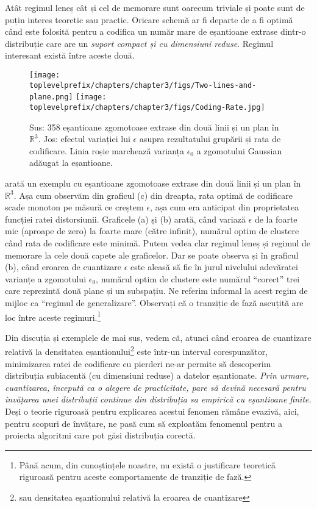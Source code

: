 \documentclass[../../book-main_ro.tex]{subfiles}
\begin{document}
Atât regimul leneș cât și cel de memorare sunt oarecum triviale și poate sunt de puțin interes teoretic sau practic. Oricare schemă ar fi departe de a fi optimă când este folosită pentru a codifica un număr mare de eșantioane extrase dintr-o distribuție care are un {\em suport compact și cu dimensiuni reduse}. Regimul interesant există între aceste două.
\begin{example}
	\begin{figure}[t]
		\centering
		\texttt{[image: \\toplevelprefix/chapters/chapter3/figs/Two-lines-and-plane.png]}
		\texttt{[image: \\toplevelprefix/chapters/chapter3/figs/Coding-Rate.jpg]}
		\caption{Sus: 358 eșantioane zgomotoase extrase din două linii și un plan în $\mathbb{R}^3$. Jos: efectul variației lui $\epsilon$ asupra rezultatului grupării și rata de codificare. Linia roșie marchează varianța $\epsilon_0$ a zgomotului Gaussian adăugat la eșantioane.}
		\label{fig:two-lines-and-plane}
		\label{fig:two-lines-and-plane-epsilon}
	\end{figure}
	 arată un exemplu cu eșantioane zgomotoase extrase din două linii și un plan în $\mathbb{R}^3$. Așa cum observăm din graficul (c) din dreapta, rata optimă de codificare scade monoton pe măsură ce creștem $\epsilon$, așa cum era anticipat din proprietatea funcției ratei distorsiunii. Graficele (a) și (b) arată, când variază $\epsilon$ de la foarte mic (aproape de zero) la foarte mare (către infinit), numărul optim de clustere când rata de codificare este minimă. Putem vedea clar regimul leneș și regimul de memorare la cele două capete ale graficelor. Dar se poate observa și în graficul (b), când eroarea de cuantizare $\epsilon$ este aleasă să fie în jurul nivelului adevăratei varianțe a zgomotului $\epsilon_0$, numărul optim de clustere este numărul ``corect'' trei care reprezintă două plane și un subspațiu. Ne referim informal la acest regim de mijloc ca ``regimul de generalizare''. Observați că o tranziție de fază ascuțită are loc între aceste regimuri.\footnote{Până acum, din cunoștințele noastre, nu există o justificare teoretică riguroasă pentru aceste comportamente de tranziție de fază.}
\end{example}

Din discuția și exemplele de mai sus, vedem că, atunci când eroarea de cuantizare relativă la densitatea eșantionului\footnote{sau densitatea eșantionului relativă la eroarea de cuantizare} este într-un interval corespunzător, minimizarea ratei de codificare cu pierderi ne-ar permite să descoperim distribuția subiacentă (cu dimensiuni reduse) a datelor eșantionate. {\em Prin urmare, cuantizarea, începută ca o alegere de practicitate, pare să devină necesară pentru învățarea unei distribuții continue din distribuția sa empirică cu eșantioane finite.} Deși o teorie riguroasă pentru explicarea acestui fenomen rămâne evazivă, aici, pentru scopuri de învățare, ne pasă cum să exploatăm fenomenul pentru a proiecta algoritmi care pot găsi distribuția corectă.
\end{document}
